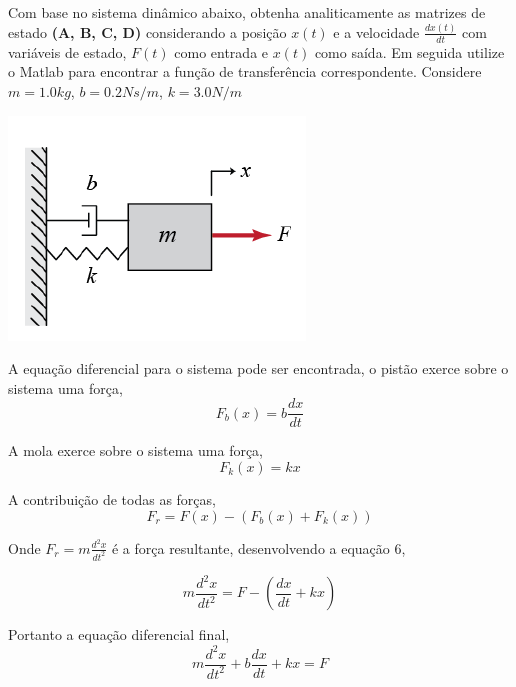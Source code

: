 \documentclass[a4paper, 10pt]{article}
\begin{document}
\begin{list}{\textbf{Questão .}}{
\setlength{\labelwidth}{-2mm} \setlength{\parsep}{0mm}
\setlength{\topsep}{0mm} \setlength{\leftmargin}{0mm}}
\newpage
\item
  Com base no sistema dinâmico abaixo, obtenha 
  analiticamente as matrizes de estado
  \textbf{(A, B, C, D)} considerando a posição $x(t)$ e a 
  velocidade $\frac{d x(t)}{dt}$ com variáveis 
  de estado, $F(t)$ como entrada e $x(t)$ como saída. Em 
  seguida utilize o Matlab para encontrar a função 
  de transferência correspondente.
  Considere $m=1.0 kg$, $b=0.2 N s/m$, $k=3.0 N/m$

            \begin{center}
            \includegraphics[scale=0.6]{fig6a.png}
            \end{center}
 

         A equação diferencial para o sistema pode ser encontrada, o pistão 
         exerce sobre o sistema uma força, 
         \begin{equation}
             F_b(x) = b \frac{d x}{d t}
         \end{equation}

         A mola exerce sobre o sistema uma força,
         \begin{equation}
             F_k(x) = k x
         \end{equation}

         A contribuição de todas as forças,
        \begin{equation}
            F_r = F(x) - (F_b(x) + F_k(x))
        \end{equation}

        Onde $F_r = m \frac{d^2 x}{d t^2}$ é a força resultante, desenvolvendo a equação 6,

        $$ 
        m \frac{d^2 x}{d t^2} = F - \left(\frac{d x}{d t} + k x\right)
        $$

         Portanto a equação diferencial final, 
        \begin{equation} 
            m \frac{d^2 x}{d t^2} +  b \frac{d x}{d t} + k x = F
        \end{equation}


\end{list}
\end{document}

